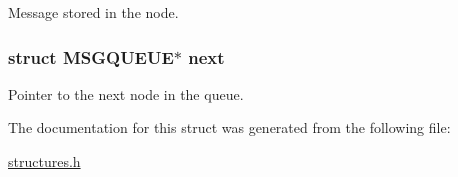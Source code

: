 Message stored in the node. 

\subsubsection[{\texorpdfstring{next}{next}}]{\setlength{\rightskip}{0pt plus 5cm}struct {\bf M\+S\+G\+Q\+U\+E\+UE}$\ast$ next}\hypertarget{struct_m_s_g_q_u_e_u_e_a3ce3a275ee413c607c79a8981174c43b}{}\label{struct_m_s_g_q_u_e_u_e_a3ce3a275ee413c607c79a8981174c43b}


Pointer to the next node in the queue. 



The documentation for this struct was generated from the following file\+:\begin{DoxyCompactItemize}
\item 
\hyperlink{structures_8h}{structures.\+h}\end{DoxyCompactItemize}
